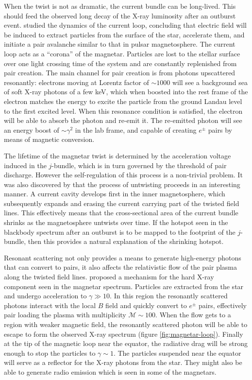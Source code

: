 When the twist is not as dramatic, the current bundle can be long-lived. This
should feed the observed long decay of the X-ray luminosity after an outburst
event. \citet{beloborodov_corona_2007} studied the dynamics of the current loop,
concluding that electric field will be induced to extract particles from the
surface of the star, accelerate them, and initiate a pair avalanche similar to
that in pulsar magnetosphere. The current loop acts as a ``corona'' of the
magnetar. Particles are lost to the stellar surface over one light crossing time
of the system and are constantly replenished from pair creation. The main
channel for pair creation is from photons upscattered resonantly: electrons
moving at Lorentz factor of $\sim 1000$ will see a background sea of soft X-ray
photons of a few keV, which when boosted into the rest frame of the electron
matches the energy to excite the particle from the ground Landau level to the
first excited level. When this resonance condition is satisfied, the electron
will be able to absorb the photon and re-emit it. The re-emitted photon will see
an energy boost of $\sim \gamma^{2}$ in the lab frame, and capable of creating
$e^{\pm}$ pairs by means of magnetic conversion.

The lifetime of the magnetar twist is determined by the acceleration voltage
induced in the $j$-bundle, which is in turn governed by the threshold of pair
discharge. However the self-regulation of this process is a non-trivial problem.
It was also discovered by \citet{beloborodov_untwisting_2009} that the process
of untwisting proceeds in an interesting manner. A current cavity develops first
in the inner magnetosphere, which subsequently expands and erasing the current
carrying part of the twisted field lines. This effectively means that the
cross-sectional area of the current bundle shrinks as the magnetosphere untwists
over time. If the hotspot seen in the blackbody spectrum after an outburst is to
be mapped to the footprint of the $j$-bundle, then this provides a natural
explanation of the shrinking hotspot.

Resonant scattering not only provides a means to generate high-energy photons
that can convert to pairs, it also affects the relativistic flow of the pair
plasma along the twisted field lines. \citet{beloborodov_mechanism_2013}
proposed a mechanism for the hard X-ray component seen in the magnetar spectrum.
Particles are extracted from the star and undergo acceleration to $\gamma\gg
10$. In this region the resonantly scattered photons interact with the local $B$
field and quickly convert to $e^{\pm}$ pairs, effectively pair loading the
plasma with multiplicity $\mathcal{M}\sim 100$. When the flow gets to a region
with weaker magnetic field, the resonantly scattered photon will be able to
escape to form the observed X-ray spectrum (figure \ref{fig:magnetar-loop}).
Finally at the tip of the magnetic loop near the equator, the radiative drag
will be strong enough to stop the particles to $\gamma \sim 1$. The particles
suspended near the equator will serve as a reflector for the X-ray photons from
the star. They might also be able to generate radio emission which is seen in
some of the magnetars.

